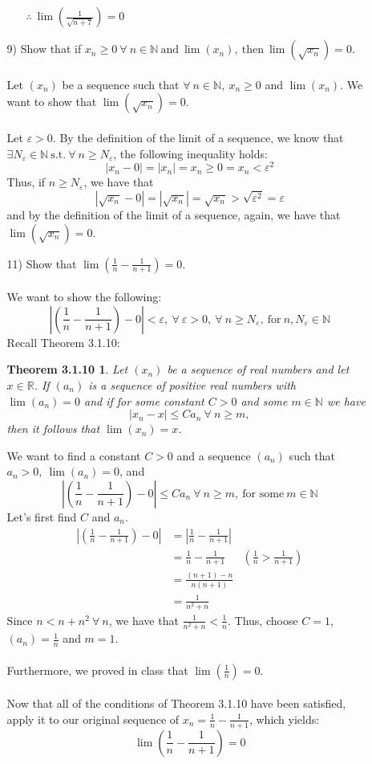 \documentclass[12pt,letterpaper]{article}
\newcommand{\st}{\ \text{s.t.}\ }
\newcommand{\abs}[1]{\left\lvert #1 \right\rvert}
\newcommand{\R}{\mathbb{R}}
\newcommand{\N}{\mathbb{N}}
\newtheorem*{3.1.10}{Theorem 3.1.10}
\theoremstyle{case}
\begin{document}
\begin{enumerate}
\begin{enumerate}
\begin{enumerate}
					\\\\$\therefore\ \lim (\frac{1}{\sqrt{n+7}})=0$
				\end{enumerate}
			\item[9)] Show that if $x_n \geq 0\ \forall\ n \in \mathbb{N}\ \text{and}\ \lim (x_n),\ \text{then}\ \lim (\sqrt{x_n})=0$.
			\\\\Let $(x_n)$ be a sequence such that $\forall\ n \in \N,\ x_n \geq 0$ and $\lim (x_n)$. We want to show that $\lim (\sqrt{x_n})=0$.
			\\\\Let $\varepsilon >0$. By the definition of the limit of a sequence, we know that $\exists N_\varepsilon \in \N \st \forall\ n \geq N_\varepsilon$, the following inequality holds:
			\[\abs{x_n-0}=\abs{x_n}=x_n \geq 0 = x_n < \varepsilon^2\]
			Thus, if $n \geq N_\varepsilon$, we have that
			\[\abs{\sqrt{x_n}-0}=\abs{\sqrt{x_n}}=\sqrt{x_n}>\sqrt{\varepsilon^2}=\varepsilon\]
			and by the definition of the limit of a sequence, again, we have that $\lim (\sqrt{x_n})=0$.
			
			\item[11)] Show that $\lim (\frac{1}{n}-\frac{1}{n+1})=0$.
			\\\\We want to show the following:
			\[\abs{\left(\frac{1}{n}-\frac{1}{n+1}\right)-0}<\varepsilon,\ \forall\ \varepsilon > 0,\ \forall\ n \geq N_\varepsilon,\ \text{for}\ n,N_\varepsilon \in \N\]
			Recall Theorem 3.1.10:
			\begin{3.1.10}
				Let $(x_n)$ be a sequence of real numbers and let $x \in \R$. If $(a_n)$ is a sequence of positive real numbers with $\lim (a_n) = 0$ and if for some constant $C>0$ and some $m \in \N$ we have 
				\[\abs{x_n-x}\leq Ca_n\ \forall\ n \geq m,\]
				then it follows that $\lim (x_n)=x$.
			\end{3.1.10}
			We want to find a constant $C>0$ and a sequence $(a_n)$ such that $a_n>0,\ \lim (a_n)=0$, and 
			\[\abs{\left(\frac{1}{n}-\frac{1}{n+1}\right)-0}\leq Ca_n\ \forall\ n \geq m,\ \text{for some}\ m \in \N\]
			Let's first find $C$ and $a_n$.
			\begin{align*}
				\abs{\left(\frac{1}{n}-\frac{1}{n+1}\right)-0} &= \abs{\frac{1}{n}-\frac{1}{n+1}}
				\\ &=\frac{1}{n}-\frac{1}{n+1} &\left(\frac{1}{n}>\frac{1}{n+1}\right)
				\\ &=\frac{(n+1)-n}{n(n+1)}
				\\ &=\frac{1}{n^2+n}
			\end{align*}
			Since $n < n+n^2\ \forall\ n$, we have that $\frac{1}{n^2+n}<\frac{1}{n}$. Thus, choose $C=1$, $(a_n)=\frac{1}{n}$ and $m=1$.
			\\\\Furthermore, we proved in class that $\lim (\frac{1}{n})=0$.
			\\\\Now that all of the conditions of Theorem 3.1.10 have been satisfied, apply it to our original sequence of $x_n = \frac{1}{n}-\frac{1}{n+1}$, which yields:
			\[\lim \left(\frac{1}{n}-\frac{1}{n+1}\right)=0\]
			

\end{enumerate}
\end{enumerate}
\end{document}
